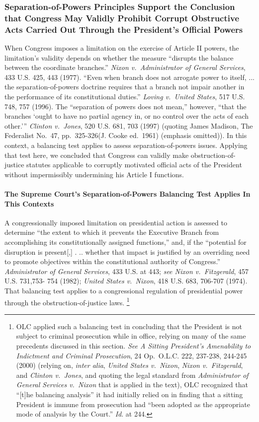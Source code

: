 \subsubsection{Separation-of-Powers Principles Support the Conclusion that Congress May Validly Prohibit Corrupt Obstructive Acts Carried Out Through the President’s Official Powers}

When Congress imposes a limitation on the exercise of Article II powers, the limitation’s validity depends on whether the measure “disrupts the balance between the coordinate branches.”
\textit{Nixon v.\ Administrator of General Services}, 433 U.S. 425, 443 (1977).
“Even when branch does not arrogate power to itself, ... the separation-of-powers doctrine requires that a branch not impair another in the performance of its constitutional duties.”
\textit{Loving v.\ United States}, 517 U.S. 748, 757 (1996).
The “separation of powers does not mean,” however, “that the branches ‘ought to have no partial agency in, or no control over the acts of each other.’”
\textit{Clinton v.\ Jones}, 520 U.S. 681, 703 (1997) (quoting James Madison, The Federalist No.~47, pp.~325-326(J. Cooke ed.~1961) (emphasis omitted)).
In this context, a balancing test applies to assess separation-of-powers issues.
Applying that test here, we concluded that Congress can validly make obstruction-of-justice statutes applicable to corruptly motivated official acts of the President without impermissibly undermining his Article I functions.

\paragraph{The Supreme Court’s Separation-of-Powers Balancing Test Applies In This Contexts}

A congressionally imposed limitation on presidential action is assessed to determine “the extent to which it prevents the Executive Branch from accomplishing its constitutionally assigned functions,” and, if the “potential for disruption is present[,] . .. whether that impact is justified by an overriding need to promote objectives within the constitutional authority of Congress.”
\textit{Administrator of General Services}, 433 U.S. at 443;
\textit{see Nixon v.\ Fitzgerald}, 457 U.S. 731,753- 754 (1982);
\textit{United States v.\ Nixon}, 418 U.S. 683, 706-707 (1974).
That balancing test applies to a congressional regulation of presidential power through the obstruction-of-justice laws.%
\footnote{OLC applied such a balancing test in concluding that the President is not subject to criminal prosecution while in office, relying on many of the same precedents discussed in this section.
\textit{See A Sitting President’s Amenability to Indictment and Criminal Prosecution}, 24 Op.\ O.L.C. 222, 237-238, 244-245 (2000) (relying on, \textit{inter alia}, \textit{United States v.\ Nixon}, \textit{Nixon v.\ Fitzgerald}, and \textit{Clinton v.\ Jones}, and quoting the legal standard from \textit{Administrator of General Services v.\ Nixon} that is applied in the text), OLC recognized that “[t]he balancing analysis” it had initially relied on in finding that a sitting President is immune from prosecution had “been adopted as the appropriate mode of analysis by the Court.”
\textit{Id}. at 244.}


